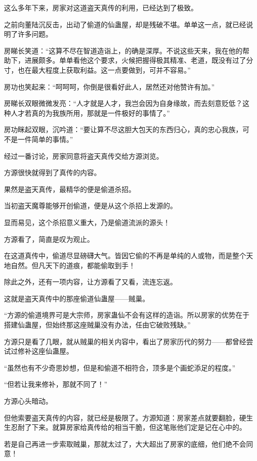 \begin{this_body}
这么多年下来，房家对这道盗天真传的利用，已经达到了极致。

之前向董陆沉反击，出动了偷道的仙蛊屋，却是残破不堪。单单这一点，就已经说明了许多问题。

房睇长笑道：“这算不尽在智道造诣上，的确是深厚。不说这些天来，我在他的帮助下，进展颇多。单单看他这个要求，火候把握得极其精准、老道，既没有过了分寸，也在最大程度上获取利益。这一点要做到，可并不容易。”

房功也笑起来：“呵呵呵，你倒是很看好此人，居然还对他赞许有加。”

房睇长双眼微微发亮：“人才就是人才，我岂会因为自身缘故，而去刻意贬低？这种人才若真的为我族所用，那就是一件极好的事情了。”

房功眯起双眼，沉吟道：“要让算不尽这胆大包天的东西归心，真的忠心我族，可不是一件简单的事情。”

经过一番讨论，房家同意将盗天真传交给方源浏览。

方源很快就得到了真传的内容。

果然是盗天真传，最精华的便是偷道杀招。

当初盗天魔尊能够开创偷道，便是从这个杀招上发源的。

显而易见，这个杀招意义重大，乃是偷道流派的源头！

方源看了，简直是叹为观止。

在这道真传中，偷道尽显磅礴大气。皆因它偷的不再是单纯的人或物，而是整个天地自然。但凡天下的道痕，都能偷取到手！

除此之外，还有一项内容，让方源看了又看，流连忘返。

这就是盗天真传中的那座偷道仙蛊屋——贼巢。

“方源的偷道境界可是大宗师，房家蛊仙不会有这样的造诣。所以房家的优势在于搭建仙蛊屋，但始终那这座贼巢没有办法，任由它破败残缺。”

方源只是看了几眼，就从贼巢的相关内容中，看出了房家历代的努力——都曾经尝试过修补这座仙蛊屋。

“虽然也有不少奇思妙想，但是和偷道不相符合，顶多是个画蛇添足的程度。”

“但若让我来修补，那就不同了！”

方源心头暗动。

但他索要盗天真传的内容，就已经是极限了。方源知道：房家差点就要翻脸，硬生生忍耐了下来。就算房家给真传给的相当干脆，但这笔账他们定是记在心中的。

若是自己再进一步索取贼巢，那就太过了，大大超出了房家的底细，他们绝不会同意！


\end{this_body}
